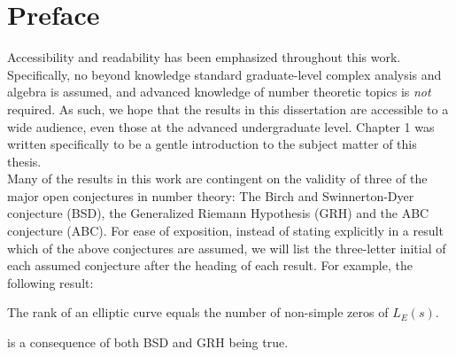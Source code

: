 \documentclass [11pt, proquest] {thesis}[2015/03/03]
\begin{document}
\chapter*{Preface}
Accessibility and readability has been emphasized throughout this work. Specifically, no beyond knowledge standard graduate-level complex analysis and algebra is assumed, and advanced knowledge of number theoretic topics is {\it not} required. As such, we hope that the results in this dissertation are accessible to a wide audience, even those at the advanced undergraduate level. Chapter 1 was written specifically to be a gentle introduction to the subject matter of this thesis. \\

Many of the results in this work are contingent on the validity of three of the major open conjectures in number theory: The Birch and Swinnerton-Dyer conjecture (BSD), the Generalized Riemann Hypothesis (GRH) and the ABC conjecture (ABC). For ease of exposition, instead of stating explicitly in a result which of the above conjectures are assumed, we will list the three-letter initial of each assumed conjecture after the heading of each result. For example, the following result:
\begin{proposition}
The rank of an elliptic curve equals the number of non-simple zeros of $L_E(s)$.
\end{proposition}
is a consequence of both BSD and GRH being true.

%
%
\tableofcontents
 
\end{document}
